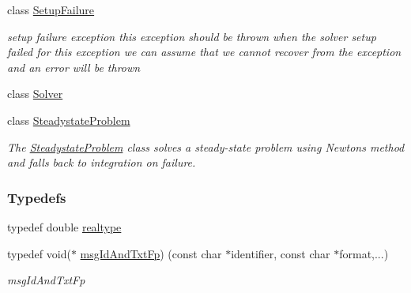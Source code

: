 \begin{DoxyCompactItemize}
class \mbox{\hyperlink{classamici_1_1_setup_failure}{Setup\+Failure}}
\begin{DoxyCompactList}\small\item\em setup failure exception this exception should be thrown when the solver setup failed for this exception we can assume that we cannot recover from the exception and an error will be thrown \end{DoxyCompactList}\item 
class \mbox{\hyperlink{classamici_1_1_solver}{Solver}}
\item 
class \mbox{\hyperlink{classamici_1_1_steadystate_problem}{Steadystate\+Problem}}
\begin{DoxyCompactList}\small\item\em The \mbox{\hyperlink{classamici_1_1_steadystate_problem}{Steadystate\+Problem}} class solves a steady-\/state problem using Newton\textquotesingle{}s method and falls back to integration on failure. \end{DoxyCompactList}\end{DoxyCompactItemize}
\subsubsection*{Typedefs}
\begin{DoxyCompactItemize}
\item 
typedef double \mbox{\hyperlink{namespaceamici_a1bdce28051d6a53868f7ccbf5f2c14a3}{realtype}}
\item 
typedef void($\ast$ \mbox{\hyperlink{namespaceamici_a02384ab9af881494db3ed32cd6ecdcc0}{msg\+Id\+And\+Txt\+Fp}}) (const char $\ast$identifier, const char $\ast$format,...)
\begin{DoxyCompactList}\small\item\em msg\+Id\+And\+Txt\+Fp \end{DoxyCompactList}\end{DoxyCompactItemize}

